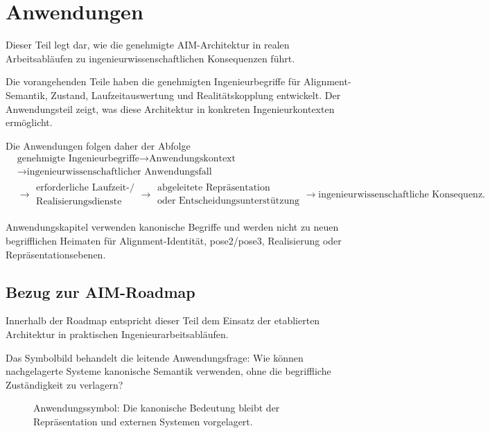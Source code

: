 
\chapter*{Anwendungen}
{}

Dieser Teil legt dar, wie die genehmigte AIM-Architektur in realen
Arbeitsabläufen zu ingenieurwissenschaftlichen Konsequenzen führt.

Die vorangehenden Teile haben die genehmigten Ingenieurbegriffe für
Alignment-Semantik, Zustand, Laufzeitauswertung und Realitätskopplung
entwickelt. Der Anwendungsteil zeigt, was diese Architektur in konkreten
Ingenieurkontexten ermöglicht.

Die Anwendungen folgen daher der Abfolge
\[
\begin{aligned}
&\text{genehmigte Ingenieurbegriffe}
\rightarrow
\text{Anwendungskontext}
\\
&\rightarrow
\text{ingenieurwissenschaftlicher Anwendungsfall}
\\
&\rightarrow
\substack{\text{erforderliche Laufzeit-/}\\\text{Realisierungsdienste}}
\rightarrow
\substack{\text{abgeleitete Repräsentation}\\\text{oder Entscheidungsunterstützung}}
\rightarrow
\text{ingenieurwissenschaftliche Konsequenz}.
\end{aligned}
\]

Anwendungskapitel verwenden kanonische Begriffe und werden nicht zu neuen
begrifflichen Heimaten für Alignment-Identität, pose2/pose3, Realisierung
oder Repräsentationsebenen.

\section*{Bezug zur AIM-Roadmap}

Innerhalb der Roadmap entspricht dieser Teil dem Einsatz der etablierten
Architektur in praktischen Ingenieurarbeitsabläufen.

Das Symbolbild behandelt die leitende Anwendungsfrage: Wie können
nachgelagerte Systeme kanonische Semantik verwenden, ohne die begriffliche
Zuständigkeit zu verlagern?

\begin{figure}[ht]
\centering

\caption{Anwendungssymbol: Die kanonische Bedeutung bleibt der Repräsentation und externen Systemen vorgelagert.}
\label{fig:icon-applications-downstream}
\end{figure}

